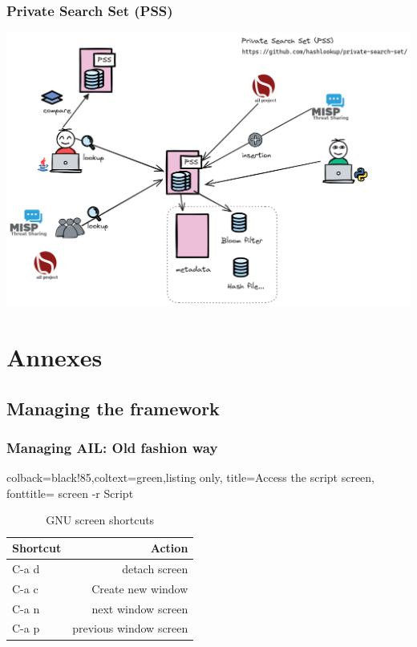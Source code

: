 \documentclass[aspectratio=169]{beamer}
\begin{document}
\begin{frame}
    \frametitle{Private Search Set (PSS)}
    \begin{center}
        \includegraphics[scale=0.27]{images/pss-overview.png}
    \end{center}
\end{frame}


\section{Annexes}


\subsection{Managing the framework}
\begin{frame}[fragile]
    \frametitle{Managing AIL: Old fashion way}
    \lstset{style=bash}
    \begin{tcblisting}{colback=black!85,coltext=green,listing only,
        title=Access the script screen, fonttitle=\bfseries}
screen -r Script
\end{tcblisting}
\begin{table}
        \caption{GNU screen shortcuts}
    \begin{tabular}{lr}
        \toprule
        Shortcut & Action \\
        \midrule
        C-a d & detach screen \\
        \midrule
        C-a c & Create new window \\
        \midrule
        C-a n & next window screen \\
        \midrule
        C-a p & previous window screen \\
        \bottomrule
    \end{tabular}
\end{table}
\end{frame}
\end{document}
